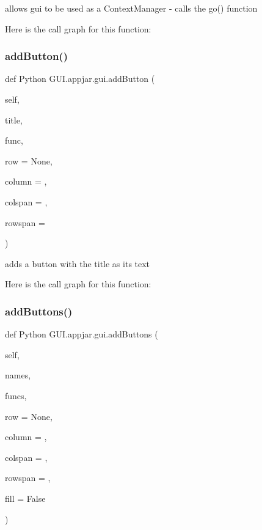 \begin{DoxyVerb}allows gui to be used as a ContextManager
    - calls the go() function \end{DoxyVerb}
 Here is the call graph for this function\+:
\mbox{\label{class_python_01_g_u_i_1_1appjar_1_1gui_a3e6cc52819dd647caaaafa80c673637c}} 
\subsubsection{\texorpdfstring{add\+Button()}{addButton()}}
{\footnotesize\ttfamily def Python G\+U\+I.\+appjar.\+gui.\+add\+Button (\begin{DoxyParamCaption}\item[{}]{self,  }\item[{}]{title,  }\item[{}]{func,  }\item[{}]{row = {\ttfamily None},  }\item[{}]{column = {},  }\item[{}]{colspan = {},  }\item[{}]{rowspan = {} }\end{DoxyParamCaption})}

\begin{DoxyVerb}adds a button with the title as its text \end{DoxyVerb}
 Here is the call graph for this function\+:
\mbox{\label{class_python_01_g_u_i_1_1appjar_1_1gui_abe1681705b905fe66678f7566489240c}} 
\subsubsection{\texorpdfstring{add\+Buttons()}{addButtons()}}
{\footnotesize\ttfamily def Python G\+U\+I.\+appjar.\+gui.\+add\+Buttons (\begin{DoxyParamCaption}\item[{}]{self,  }\item[{}]{names,  }\item[{}]{funcs,  }\item[{}]{row = {\ttfamily None},  }\item[{}]{column = {},  }\item[{}]{colspan = {},  }\item[{}]{rowspan = {},  }\item[{}]{fill = {\ttfamily False} }\end{DoxyParamCaption})}

